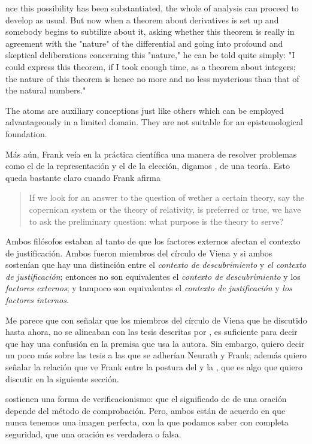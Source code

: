 nce this possibility has been substantiated,  the whole of analysis can proceed to develop as usual.  But now when a theorem about derivatives is set up  and somebody begins to subtilize about it, asking  whether this theorem is really in agreement with the  "nature" of the differential and going into profound  and skeptical deliberations concerning this "nature,"  he can be told quite simply: "I could express this  theorem, if I took enough time, as a theorem about  integers; the nature of this theorem is hence no more  and no less mysterious than that of the natural  numbers."

The  atoms are auxiliary conceptions just like others which  can be employed advantageously in a limited domain.  They are not suitable for an epistemological foundation.

Más aún, Frank veía en la práctica científica una manera de resolver problemas como el de la representación y el de la elección, digamos , de una teoría.
Esto queda bastante claro cuando Frank afirma

\begin{quote}
	If we look for an answer to the question of wether a certain theory, say the copernican system or the theory of relativity, is preferred or true, we have to ask the preliminary question: what purpose is the theory to serve? \parencite[p. 15]{Frank1954}
\end{quote}

Ambos filósofos estaban al tanto de que los factores externos afectan el contexto de justificación.
Ambos fueron miembros del círculo de Viena y si ambos sostenían que hay una distinción entre el \emph{contexto de descubrimiento} y \emph{el contexto de justificación}; entonces no son equivalentes el \emph{contexto de descubrimiento} y los \emph{factores externos}; y  tampoco son equivalentes el \emph{contexto de justificación} y \emph{los factores internos}.

Me parece que con señalar que los miembros del círculo de Viena que he discutido hasta ahora, no se alineaban con las tesis descritas por \parencite{Yturbe1995}, es suficiente para decir que hay una confusión en la premisa que usa la autora.
Sin embargo, quiero decir un poco más sobre las tesis a las que se adherían Neurath y Frank; además quiero señalar la relación que ve Frank entre la postura del  y la , que es algo que quiero discutir en la siguiente sección.

 sostienen una forma de verificacionismo: que el significado de de una oración depende del método de comprobación.
Pero, ambos están de acuerdo en que nunca tenemos una imagen perfecta, con la que podamos saber con completa seguridad, que una oración es verdadera o falsa.



